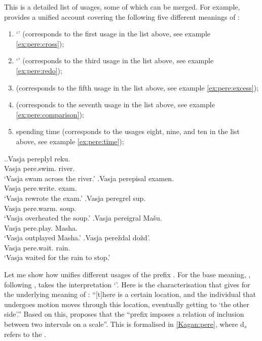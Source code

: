 This is a detailed list of  usages, some of which can be merged. For example, \citet[119--125]{Kagan:book} provides a unified account covering the following five different meanings of : 
\begin{enumerate}
\item `' (corresponds to the first usage in the list above, see example \ref{ex:pere:cross});
\item `' (corresponds to the third usage in the list above, see example \ref{ex:pere:redo});
\item {} (corresponds to the fifth usage in the list above, see example \ref{ex:pere:excess});
\item {} (corresponds to the seventh usage in the list above, see example \ref{ex:pere:comparison});
\item spending time (corresponds to the usages eight, nine, and ten in the list above, see example \ref{ex:pere:time});
\end{enumerate}

\ex.\label{ex:pere}\ag.\label{ex:pere:cross}Vasja pereplyl reku.\\
Vasja pere.swim. river.\\
\trans `Vasja swam across the river.'
\bg.\label{ex:pere:redo}Vasja perepisal examen.\\
Vasja pere.write. exam.\\
\trans `Vasja rewrote the exam.'
\bg.\label{ex:pere:excess}Vasja peregrel sup.\\
Vasja pere.warm. soup.\\
\trans `Vasja overheated the soup.'
\bg.\label{ex:pere:comparison}Vasja pereigral Ma\v{s}u.\\
Vasja pere.play. Masha.\\
\trans `Vasja outplayed Masha.'
\bg.\label{ex:pere:time}Vasja pere\v{z}dal do\v{z}d'.\\
Vasja pere.wait. rain.\\
\trans `Vasja waited for the rain to stop.'

Let me show how \citet{Kagan:book} unifies different usages of the prefix . For the base meaning, \citet[120--121]{Kagan:book}, following \citet{Janda:88}, takes the  interpretation `'. Here is the characterisation that \citet[121]{Kagan:book} gives for the underlying meaning of : ``[t]here is a certain  location, and the individual that undergoes motion moves through this location, eventually getting to `the other side'.'' Based on this, \citet[122]{Kagan:book} proposes that the ``prefix imposes a relation of inclusion between two intervals on a scale''. This is formalised in \ref{Kagan:pere}, where d$_s$ refers to the  .

